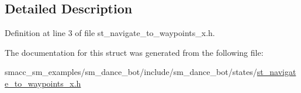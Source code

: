 \subsection{Detailed Description}


Definition at line 3 of file st\+\_\+navigate\+\_\+to\+\_\+waypoints\+\_\+x.\+h.



The documentation for this struct was generated from the following file\+:\begin{DoxyCompactItemize}
\item 
smacc\+\_\+sm\+\_\+examples/sm\+\_\+dance\+\_\+bot/include/sm\+\_\+dance\+\_\+bot/states/\hyperlink{st__navigate__to__waypoints__x_8h}{st\+\_\+navigate\+\_\+to\+\_\+waypoints\+\_\+x.\+h}\end{DoxyCompactItemize}
